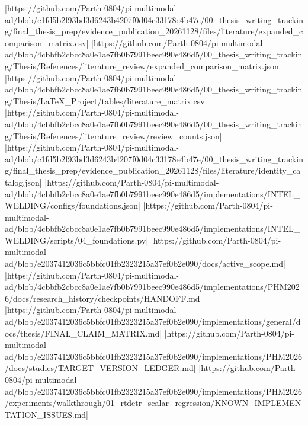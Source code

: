 |https://github.com/Parth-0804/pi-multimodal-ad/blob/c1fd5b2f93bd3d6243b4207f0d04c33178e4b47e/00_thesis_writing_tracking/final_thesis_prep/evidence_publication_20261128/files/literature/expanded_comparison_matrix.csv|
|https://github.com/Parth-0804/pi-multimodal-ad/blob/4cbbfb2cbcc8a0e1ae7fb0b7991beec990e486d5/00_thesis_writing_tracking/Thesis/References/literature_review/expanded_comparison_matrix.json|
|https://github.com/Parth-0804/pi-multimodal-ad/blob/4cbbfb2cbcc8a0e1ae7fb0b7991beec990e486d5/00_thesis_writing_tracking/Thesis/LaTeX_Project/tables/literature_matrix.csv|
|https://github.com/Parth-0804/pi-multimodal-ad/blob/4cbbfb2cbcc8a0e1ae7fb0b7991beec990e486d5/00_thesis_writing_tracking/Thesis/References/literature_review/review_counts.json|
|https://github.com/Parth-0804/pi-multimodal-ad/blob/c1fd5b2f93bd3d6243b4207f0d04c33178e4b47e/00_thesis_writing_tracking/final_thesis_prep/evidence_publication_20261128/files/literature/identity_catalog.json|
|https://github.com/Parth-0804/pi-multimodal-ad/blob/4cbbfb2cbcc8a0e1ae7fb0b7991beec990e486d5/implementations/INTEL_WELDING/configs/foundations.json|
|https://github.com/Parth-0804/pi-multimodal-ad/blob/4cbbfb2cbcc8a0e1ae7fb0b7991beec990e486d5/implementations/INTEL_WELDING/scripts/04_foundations.py|
|https://github.com/Parth-0804/pi-multimodal-ad/blob/e2037412036c5bbfc01fb2323215a37ef0b2e090/docs/active_scope.md|
|https://github.com/Parth-0804/pi-multimodal-ad/blob/4cbbfb2cbcc8a0e1ae7fb0b7991beec990e486d5/implementations/PHM2026/docs/research_history/checkpoints/HANDOFF.md|
|https://github.com/Parth-0804/pi-multimodal-ad/blob/e2037412036c5bbfc01fb2323215a37ef0b2e090/implementations/general/docs/thesis/FINAL_CLAIM_MATRIX.md|
|https://github.com/Parth-0804/pi-multimodal-ad/blob/e2037412036c5bbfc01fb2323215a37ef0b2e090/implementations/PHM2026/docs/studies/TARGET_VERSION_LEDGER.md|
|https://github.com/Parth-0804/pi-multimodal-ad/blob/e2037412036c5bbfc01fb2323215a37ef0b2e090/implementations/PHM2026/experiments/walkthrough/01_rtdetr_scalar_regression/KNOWN_IMPLEMENTATION_ISSUES.md|
